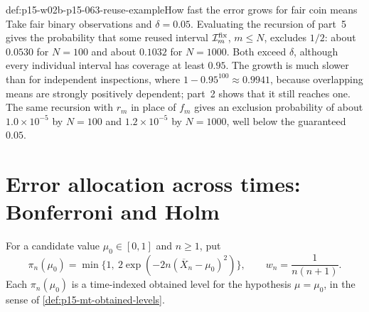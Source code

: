 \begin{hbexample}{def:p15-w02b-p15-063-reuse-example}{How fast the error grows for fair coin means}
Take fair binary observations and \(\delta=0.05\). Evaluating the
recursion of part~5 gives the probability that some reused interval
\(\mathcal I^{\rm fix}_m\), \(m\leq N\), excludes \(1/2\): about
\(0.0530\) for \(N=100\) and about \(0.1032\) for \(N=1000\). Both
exceed \(\delta\), although every individual interval has coverage at
least \(0.95\). The growth is much slower than for independent
inspections, where \(1-0.95^{100}\approx0.9941\), because overlapping
means are strongly positively dependent; part~2 shows that it still
reaches one. The same recursion with \(r_m\) in place of \(f_m\) gives an
exclusion probability of about \(1.0\times10^{-5}\) by \(N=100\) and
\(1.2\times10^{-5}\) by \(N=1000\), well below the guaranteed \(0.05\).
\end{hbexample}

\section{Error allocation across times: Bonferroni and Holm}
\label{sec:p15-w02b-p15-063-allocation}

For a candidate value \(\mu_0\in[0,1]\) and \(n\geq1\), put
\[
 \pi_n(\mu_0)=\min\{1,\ 2\exp(-2n(\overline X_n-\mu_0)^2)\},
 \qquad w_n=\frac1{n(n+1)} .
\]
Each \(\pi_n(\mu_0)\) is a time-indexed obtained level for the hypothesis
\(\mu=\mu_0\), in the sense of \cref{def:p15-mt-obtained-levels}.

